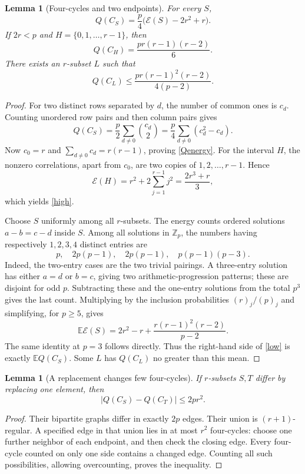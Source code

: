 \documentclass[11pt,a4paper]{article}
\newcommand{\E}{\mathbb E}
\newcommand{\Z}{\mathbb Z}
\newtheorem{lemma}[theorem]{Lemma}
\begin{document}
\begin{lemma}[Four-cycles and two endpoints]\label{endpoints}
For every $S$,
\begin{equation}\label{Qenergy}
 Q(C_S)=\frac p4\bigl(\mathcal E(S)-2r^2+r\bigr).
\end{equation}
If $2r<p$ and $H=\{0,1,\ldots,r-1\}$, then
\begin{equation}\label{high}
 Q(C_H)=\frac{pr(r-1)(r-2)}6.
\end{equation}
There exists an $r$-subset $L$ such that
\begin{equation}\label{low}
 Q(C_L)\le\frac{pr(r-1)^2(r-2)}{4(p-2)}.
\end{equation}
\end{lemma}
\begin{proof}
For two distinct rows separated by $d$, the number of common ones is $c_d$. Counting unordered row pairs and then column pairs gives
\[
 Q(C_S)=\frac p2\sum_{d\ne0}\binom{c_d}2
       =\frac p4\sum_{d\ne0}(c_d^2-c_d).
\]
Now $c_0=r$ and $\sum_{d\ne0}c_d=r(r-1)$, proving \eqref{Qenergy}. For the interval $H$, the nonzero correlations, apart from $c_0$, are two copies of $1,2,\ldots,r-1$. Hence
\[
 \mathcal E(H)=r^2+2\sum_{j=1}^{r-1}j^2=\frac{2r^3+r}{3},
\]
which yields \eqref{high}.

Choose $S$ uniformly among all $r$-subsets. The energy counts ordered solutions $a-b=c-d$ inside $S$. Among all solutions in $\Z_p$, the numbers having respectively $1,2,3,4$ distinct entries are
\[
 p,\quad 2p(p-1),\quad 2p(p-1),\quad p(p-1)(p-3).
\]
Indeed, the two-entry cases are the two trivial pairings. A three-entry solution has either $a=d$ or $b=c$, giving two arithmetic-progression patterns; these are disjoint for odd $p$. Subtracting these and the one-entry solutions from the total $p^3$ gives the last count. Multiplying by the inclusion probabilities $(r)_j/(p)_j$ and simplifying, for $p\ge5$, gives
\[
 \E\mathcal E(S)=2r^2-r+\frac{r(r-1)^2(r-2)}{p-2}.
\]
The same identity at $p=3$ follows directly. Thus the right-hand side of \eqref{low} is exactly $\E Q(C_S)$. Some $L$ has $Q(C_L)$ no greater than this mean.
\end{proof}

\begin{lemma}[A replacement changes few four-cycles]\label{stepQ}
If $r$-subsets $S,T$ differ by replacing one element, then
\[
 |Q(C_S)-Q(C_T)|\le2pr^2.
\]
\end{lemma}
\begin{proof}
Their bipartite graphs differ in exactly $2p$ edges. Their union is $(r+1)$-regular. A specified edge in that union lies in at most $r^2$ four-cycles: choose one further neighbor of each endpoint, and then check the closing edge. Every four-cycle counted on only one side contains a changed edge. Counting all such possibilities, allowing overcounting, proves the inequality.
\end{proof}
\end{document}
